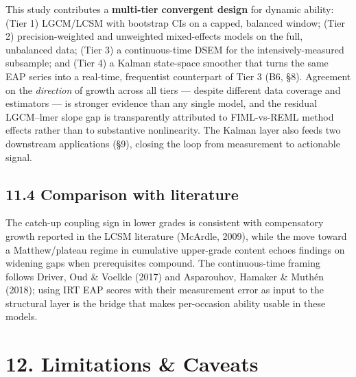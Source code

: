 \documentclass[
]{article}
\begin{document}
This study contributes a \textbf{multi-tier convergent design} for
dynamic ability: (Tier 1) LGCM/LCSM with bootstrap CIs on a capped,
balanced window; (Tier 2) precision-weighted and unweighted
mixed-effects models on the full, unbalanced data; (Tier 3) a
continuous-time DSEM for the intensively-measured subsample; and (Tier
4) a Kalman state-space smoother that turns the same EAP series into a
real-time, frequentist counterpart of Tier 3 (B6, §8). Agreement on the
\emph{direction} of growth across all tiers --- despite different data
coverage and estimators --- is stronger evidence than any single model,
and the residual LGCM--lmer slope gap is transparently attributed to
FIML-vs-REML method effects rather than to substantive nonlinearity. The
Kalman layer also feeds two downstream applications (§9), closing the
loop from measurement to actionable signal.

\hypertarget{comparison-with-literature}{%
\subsection{11.4 Comparison with
literature}\label{comparison-with-literature}}

The catch-up coupling sign in lower grades is consistent with
compensatory growth reported in the LCSM literature (McArdle, 2009),
while the move toward a Matthew/plateau regime in cumulative upper-grade
content echoes findings on widening gaps when prerequisites compound.
The continuous-time framing follows Driver, Oud \& Voelkle (2017) and
Asparouhov, Hamaker \& Muthén (2018); using IRT EAP scores with their
measurement error as input to the structural layer is the bridge that
makes per-occasion ability usable in these models.

\hypertarget{limitations-caveats}{%
\section{12. Limitations \& Caveats}\label{limitations-caveats}}
\end{document}
